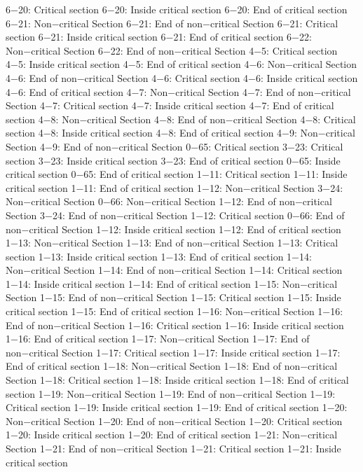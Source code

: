 6−20: Critical section
6−20: Inside critical section
6−20: End of critical section
6−21: Non−critical Section
6−21: End of non−critical Section
6−21: Critical section
6−21: Inside critical section
6−21: End of critical section
6−22: Non−critical Section
6−22: End of non−critical Section
4−5: Critical section
4−5: Inside critical section
4−5: End of critical section
4−6: Non−critical Section
4−6: End of non−critical Section
4−6: Critical section
4−6: Inside critical section
4−6: End of critical section
4−7: Non−critical Section
4−7: End of non−critical Section
4−7: Critical section
4−7: Inside critical section
4−7: End of critical section
4−8: Non−critical Section
4−8: End of non−critical Section
4−8: Critical section
4−8: Inside critical section
4−8: End of critical section
4−9: Non−critical Section
4−9: End of non−critical Section
0−65: Critical section
3−23: Critical section
3−23: Inside critical section
3−23: End of critical section
0−65: Inside critical section
0−65: End of critical section
1−11: Critical section
1−11: Inside critical section
1−11: End of critical section
1−12: Non−critical Section
3−24: Non−critical Section
0−66: Non−critical Section
1−12: End of non−critical Section
3−24: End of non−critical Section
1−12: Critical section
0−66: End of non−critical Section
1−12: Inside critical section
1−12: End of critical section
1−13: Non−critical Section
1−13: End of non−critical Section
1−13: Critical section
1−13: Inside critical section
1−13: End of critical section
1−14: Non−critical Section
1−14: End of non−critical Section
1−14: Critical section
1−14: Inside critical section
1−14: End of critical section
1−15: Non−critical Section
1−15: End of non−critical Section
1−15: Critical section
1−15: Inside critical section
1−15: End of critical section
1−16: Non−critical Section
1−16: End of non−critical Section
1−16: Critical section
1−16: Inside critical section
1−16: End of critical section
1−17: Non−critical Section
1−17: End of non−critical Section
1−17: Critical section
1−17: Inside critical section
1−17: End of critical section
1−18: Non−critical Section
1−18: End of non−critical Section
1−18: Critical section
1−18: Inside critical section
1−18: End of critical section
1−19: Non−critical Section
1−19: End of non−critical Section
1−19: Critical section
1−19: Inside critical section
1−19: End of critical section
1−20: Non−critical Section
1−20: End of non−critical Section
1−20: Critical section
1−20: Inside critical section
1−20: End of critical section
1−21: Non−critical Section
1−21: End of non−critical Section
1−21: Critical section
1−21: Inside critical section
